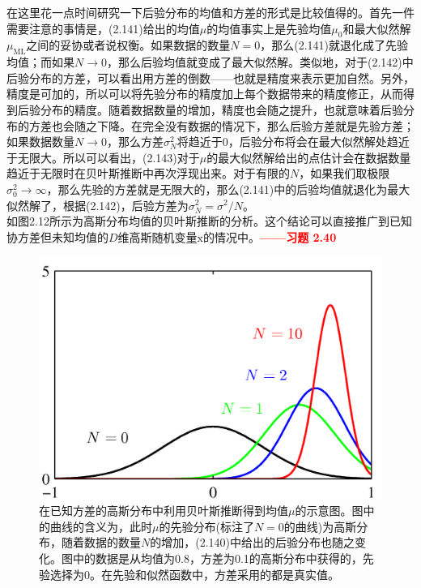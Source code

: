 \documentclass[b5paper]{book}
\numberwithin{equation}{chapter}
\newcommand {\bx} {\boldsymbol{\mathrm{x}}}
\begin{document}
{\begin{equation}
	\end{equation}
	\indent 在这里花一点时间研究一下后验分布的均值和方差的形式是比较值得的。首先一件需要注意的事情是，(2.141)给出的均值$\mu$的均值事实上是先验均值$\mu_0$和最大似然解$\mu_{\mathrm{ML}}$之间的妥协或者说权衡。如果数据的数量$N=0$，那么(2.141)就退化成了先验均值；而如果$N \rightarrow 0$，那么后验均值就变成了最大似然解。类似地，对于(2.142)中后验分布的方差，可以看出用方差的倒数——也就是精度来表示更加自然。另外，精度是可加的，所以可以将先验分布的精度加上每个数据带来的精度修正，从而得到后验分布的精度。随着数据数量的增加，精度也会随之提升，也就意味着后验分布的方差也会随之下降。在完全没有数据的情况下，那么后验方差就是先验方差；如果数据数量$N \rightarrow 0$，那么方差$\sigma_N^2$将趋近于0，后验分布将会在最大似然解处趋近于无限大。所以可以看出，(2.143)对于$\mu$的最大似然解给出的点估计会在数据数量趋近于无限时在贝叶斯推断中再次浮现出来。对于有限的$N$，如果我们取极限$\sigma_0^2 \rightarrow \infty$，那么先验的方差就是无限大的，那么(2.141)中的后验均值就退化为最大似然解了，根据(2.142)，后验方差为$\sigma_N^2=\sigma^2/N$。\\
	\indent 如图2.12所示为高斯分布均值的贝叶斯推断的分析。这个结论可以直接推广到已知协方差但未知均值的$D$维高斯随机变量$\bx$的情况中。\textcolor{red}{\textbf{——习题 2.40}}
	\begin{figure}[ht]
		\centering
		\includegraphics[scale=0.8]{Images/2-12.png}
		\caption{在已知方差的高斯分布中利用贝叶斯推断得到均值$\mu$的示意图。图中的曲线的含义为，此时$\mu$的先验分布(标注了$N=0$的曲线)为高斯分布，随着数据的数量$N$的增加，(2.140)中给出的后验分布也随之变化。图中的数据是从均值为0.8，方差为0.1的高斯分布中获得的，先验选择为0。在先验和似然函数中，方差采用的都是真实值。}

\end{figure}}
\end{document}
